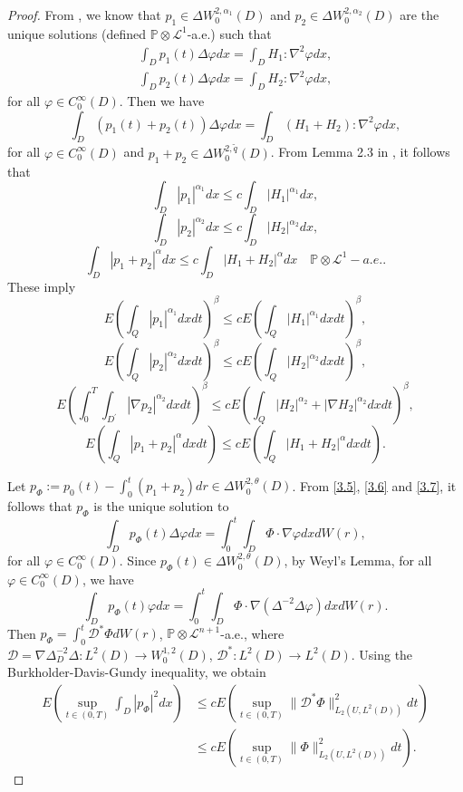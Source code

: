 \documentclass[reqno]{amsart}
\theoremstyle{definition}
\theoremstyle{remark}
\numberwithin{equation}{section} \allowdisplaybreaks
\begin{document}
\begin{proof}
From \cite{RM}, we know that $p_1\in\Delta W_0^{2,\alpha_1}(D)$ and
$p_2\in \Delta W_0^{2,\alpha_2}(D)$ are the unique solutions
(defined $\mathbb{P}\otimes \mathcal{L}^1$-a.e.) such that
\begin{equation}\label{3.6}
\begin{split}
\int_{D}p_1(t)\Delta\varphi dx=\int_DH_1:\nabla^2\varphi dx,
\end{split}
\end{equation}
\begin{equation}\label{3.7}
\begin{split}
\int_{D}p_2(t)\Delta\varphi dx=\int_DH_2:\nabla^2\varphi dx,
\end{split}
\end{equation}
for all $\varphi\in C_0^\infty(D)$. Then we have
$$\int_{D}(p_1(t)+p_2(t))\Delta\varphi dx=\int_D(H_1+H_2):\nabla^2\varphi dx,$$
for all $\varphi\in C_0^\infty(D)$ and $p_1+p_2\in\Delta
W_0^{2,\tilde{q}}(D)$. From Lemma 2.3 in \cite{JW}, it follows that
$$\int_D|p_1|^{\alpha_1}dx\leq c \int_D|H_1|^{\alpha_1}dx,$$
$$ \int_D|p_2|^{\alpha_2}dx\leq c \int_D|H_2|^{\alpha_2}dx,$$
$$ \int_D|p_1+p_2|^{\alpha}dx\leq c \int_D|H_1+H_2|^{\alpha}dx\quad \mathbb{P}\otimes\mathcal{L}^1-a.e..$$
These imply
$$E\left(\int_Q|p_1|^{\alpha_1}dxdt\right)^\beta\leq cE\left(\int_Q|H_1|^{\alpha_1}dxdt\right)^\beta,$$
$$E\left(\int_Q|p_2|^{\alpha_2}dxdt\right)^\beta\leq cE\left(\int_Q|H_2|^{\alpha_2}dxdt\right)^\beta,$$
$$E\left(\int_0^T\int_{D^\prime}|\nabla p_2|^{\alpha_2}dxdt\right)^\beta\leq cE\left(\int_Q|H_2|^{\alpha_2}+|\nabla H_2|^{\alpha_2}dxdt\right)^\beta,$$
$$E\left(\int_Q|p_1+p_2|^{\alpha}dxdt\right)\leq cE\left(\int_Q|H_1+H_2|^{\alpha}dxdt\right).$$

Let $p_\Phi:=p_0(t)-\int_0^t(p_1+p_2)dr \in \Delta
W_0^{2,\theta}(D)$. From \eqref{3.5}, \eqref{3.6} and \eqref{3.7},
it follows that $p_\Phi$ is the unique solution to
$$\int_{D}p_\Phi(t)\Delta\varphi dx=\int_0^t\!\!\!\int_{D}\Phi\cdot\nabla\varphi dx dW(r),$$
for all $\varphi\in C_0^\infty(D)$. Since $p_{\Phi}(t)\in \Delta
W_0^{2,\theta}(D)$, by Weyl's Lemma, for all $\varphi\in
C_0^\infty(D)$, we have
$$\int_{D}p_\Phi(t)\varphi dx=\int_0^t\!\!\!\int_{D}\Phi\cdot\nabla(\Delta^{-2}\Delta\varphi) dx dW(r).$$
Then $p_\Phi=\int_0^t\mathcal{D}^*\Phi dW(r)$,
$\mathbb{P}\otimes\mathcal{L}^{n+1}$-a.e., where
$\mathcal{D}=\nabla\Delta_D^{-2}\Delta:L^2(D)\rightarrow
W_0^{1,2}(D)$, $\mathcal{D}^*:L^2(D)\rightarrow L^2(D)$. Using the
 Burkholder-Davis-Gundy inequality, we obtain
\begin{equation}\label{3.8}
\begin{split}
E\left(\sup_{t\in(0,T)}\int_{D}|p_\Phi|^2 dx\right)
&\leq cE\left(\sup_{t\in(0,T)}\|\mathcal{D}^*\Phi\|^2_{L_2(U,L^2(D))}dt\right)\\
&\leq cE\left(\sup_{t\in(0,T)}\|\Phi\|^2_{L_2(U,L^2(D))}dt\right).
\end{split}
\end{equation}


\end{proof}
\end{document}
